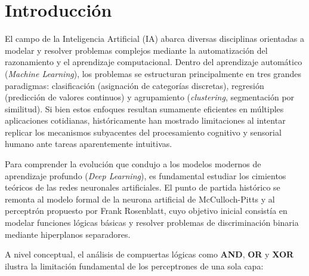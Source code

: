 \documentclass[12pt]{article}
\begin{document}
	
	\newpage
	\tableofcontents %
	\vspace{1cm}
	
	\listoffigures    %
	\newpage
	
	
	\section{Introducción}
	El campo de la Inteligencia Artificial (IA) abarca diversas disciplinas orientadas a modelar y resolver problemas complejos mediante la automatización del razonamiento y el aprendizaje computacional. Dentro del aprendizaje automático (\textit{Machine Learning}), los problemas se estructuran principalmente en tres grandes paradigmas: clasificación (asignación de categorías discretas), regresión (predicción de valores continuos) y agrupamiento (\textit{clustering}, segmentación por similitud). Si bien estos enfoques resultan sumamente eficientes en múltiples aplicaciones cotidianas, históricamente han mostrado limitaciones al intentar replicar los mecanismos subyacentes del procesamiento cognitivo y sensorial humano ante tareas aparentemente intuitivas.
	
	Para comprender la evolución que condujo a los modelos modernos de aprendizaje profundo (\textit{Deep Learning}), es fundamental estudiar los cimientos teóricos de las redes neuronales artificiales. El punto de partida histórico se remonta al modelo formal de la neurona artificial de McCulloch-Pitts y al perceptrón propuesto por Frank Rosenblatt, cuyo objetivo inicial consistía en modelar funciones lógicas básicas y resolver problemas de discriminación binaria mediante hiperplanos separadores.
	
	A nivel conceptual, el análisis de compuertas lógicas como \textbf{AND}, \textbf{OR} y \textbf{XOR} ilustra la limitación fundamental de los perceptrones de una sola capa:
	
\end{document}
